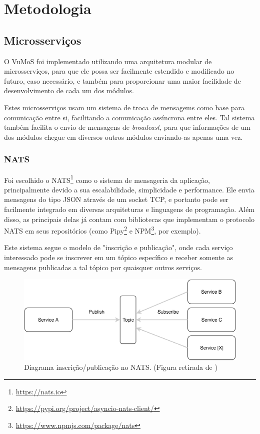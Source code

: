 \chapter{Metodologia}
\label{cap:metodologia}

\section{Microsserviços}

    O VuMoS foi implementado utilizando uma arquitetura modular de microsserviços, para que ele possa ser facilmente estendido e modificado no futuro, caso necessário, e também para proporcionar uma maior facilidade de desenvolvimento de cada um dos módulos.
    
    Estes microsserviços usam um sistema de troca de mensagems como base para comunicação entre si, facilitando a comunicação assíncrona entre eles. Tal sistema também facilita o envio de mensagens de \textit{broadcast}, para que informações de um dos módulos chegue em diversos outros módulos enviando-as apenas uma vez. 
    
    \subsection{NATS}
    
    Foi escolhido o NATS\footnote{\url{https://nats.io}} como o sistema de mensageria da aplicação, principalmente devido a sua escalabilidade, simplicidade e performance. Ele envia mensagens do tipo JSON através de um socket TCP, e portanto pode ser facilmente integrado em diversas arquiteturas e linguagens de programação. Além disso, as principais delas já contam com bibliotecas que implementam o protocolo NATS em seus repositórios (como Pipy\footnote{\url{https://pypi.org/project/asyncio-nats-client/}} e NPM\footnote{\url{https://www.npmjs.com/package/nats}}, por exemplo).
    
    Este sistema segue o modelo de "inscrição e publicação", onde cada serviço interessado pode se inscrever em um tópico específico e receber somente as mensagens publicadas a tal tópico por quaisquer outros serviços. 
    
    \begin{figure}[H]
        \includegraphics[scale=0.8]{figuras/nats_diagram.png}
        \caption{Diagrama inscrição/publicação no NATS. (Figura retirada de \cite{natsmicro})\label{fig:nats-diagram}}
    \end{figure}
    
